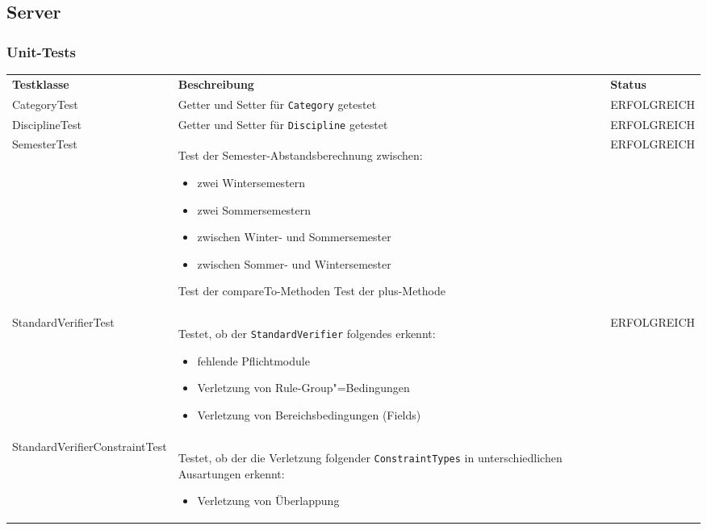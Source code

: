 \FloatBarrier
\subsection{Server}

\subsubsection*{Unit-Tests}

\begin{longtable}{| >{\hspace{0pt}} p{} | >{\hspace{0pt}} p{} | >{\hspace{0pt}} p{} |}
	\hline
	\textbf{Testklasse} & \textbf{Beschreibung} & \textbf{Status} \\ 
	\hhline{|=|=|=|}  
	\endfirsthead
	\endhead
	CategoryTest & Getter und Setter für \texttt{Category} getestet & ERFOLGREICH \\
	\hline
	DisciplineTest & Getter und Setter für \texttt{Discipline} getestet & ERFOLGREICH \\
	\hline
	SemesterTest & Test der Semester-Abstandsberechnung zwischen:
	\begin{itemize}
		\item zwei Wintersemestern
		\item zwei Sommersemestern
		\item zwischen Winter- und Sommersemester
		\item zwischen Sommer- und Wintersemester
	\end{itemize}
	Test der compareTo-Methoden \newline
	Test der plus-Methode   & ERFOLGREICH \\
	\hline
	StandardVerifierTest & Testet, ob der \texttt{StandardVerifier} folgendes erkennt:
	\begin{itemize}
		\item fehlende Pflichtmodule
		\item Verletzung von Rule-Group"=Bedingungen
		\item Verletzung von Bereichsbedingungen (Fields)
	\end{itemize} & ERFOLGREICH \\
	\hline
	StandardVerifierConstraintTest & Testet, ob der die Verletzung folgender \texttt{ConstraintTypes} in unterschiedlichen Ausartungen erkennt:
	\begin{itemize}
		\item Verletzung von Überlappung 

\end{itemize}
\end{longtable}
